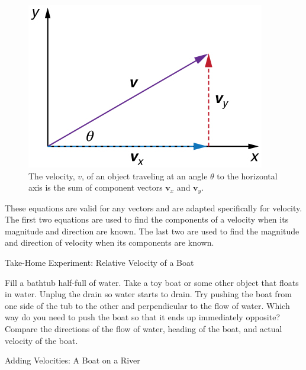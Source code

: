 \documentclass[
]{book}
\begin{document}
\begin{figure}
\hypertarget{import-auto-id1382383}{%
\centering
\includegraphics{images/Figure_03_05_03a.jpg}
\caption{The velocity, \(v{}\), of an object traveling at an angle \(\theta{}\) to
the horizontal axis is the sum of component vectors \(\textbf{v}_{x}{}\)
and
\(\textbf{v}_{y}{}\).}\label{import-auto-id1382383}
}
\end{figure}

These equations are valid for any vectors and are adapted specifically
for velocity. The first two equations are used to find the components of
a velocity when its magnitude and direction are known. The last two are
used to find the magnitude and direction of velocity when its components
are known.

\hypertarget{fs-id2187811}{}
Take-Home Experiment: Relative Velocity of a Boat

Fill a bathtub half-full of water. Take a toy boat or some other object
that floats in water. Unplug the drain so water starts to drain. Try
pushing the boat from one side of the tub to the other and perpendicular
to the flow of water. Which way do you need to push the boat so that it
ends up immediately opposite? Compare the directions of the flow of
water, heading of the boat, and actual velocity of the boat.

\hypertarget{fs-id1076781}{}
Adding Velocities: A Boat on a River
\end{document}
